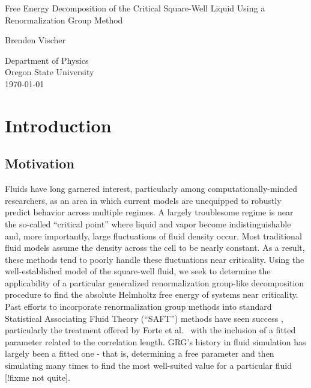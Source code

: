 \documentclass[12pt]{article}
\title
\author \\
\renewcommand{\title}{Free Energy Decomposition of the Critical Square-Well Liquid Using a Renormalization Group Method}
\renewcommand{\author}{Brenden Vischer}
\renewcommand{\titlepage}{
    {\centering
        \vspace*{4cm}
        
        \title
        
        \vspace{1.5cm}
        
        \author \\
        \text{Advisor: David Roundy}
        
        \vfill
        
        Department of Physics\\
        Oregon State University\\
        \today 
        \newpage}       
}
\begin{document}
\titlepage





\tableofcontents
\listoffigures





\section{Introduction}
\subsection{Motivation}
Fluids have long garnered interest\cite{theorysimpleliquids}\cite{theoryofcrits}, particularly among computationally-minded researchers, as an area in which current models are unequipped to robustly predict behavior across multiple regimes. A largely troublesome \cite{white2001global} regime is near the so-called ``critical point'' where liquid and vapor become indistinguishable and, more importantly, large fluctuations of fluid density occur. Most traditional fluid models assume the density across the cell to be nearly constant. As a result, these methods tend to poorly handle these fluctuations near criticality. Using the well-established model of the square-well fluid, we seek to determine the applicability of a particular generalized renormalization group-like decomposition procedure to find the absolute Helmholtz free energy of systems near criticality.\\

Past efforts to incorporate renormalization group methods into standard Statistical Associating Fluid Theory (``SAFT'') methods have seen success \cite{white2001global}, particularly the treatment offered by Forte et al.~\cite{forte2011application} with the inclusion of a fitted parameter related to the correlation length. GRG's history in fluid simulation has largely been a fitted one - that is, determining a free parameter and then simulating many times to find the most well-suited value for a particular fluid [!fixme not quite].\\
\end{document}

